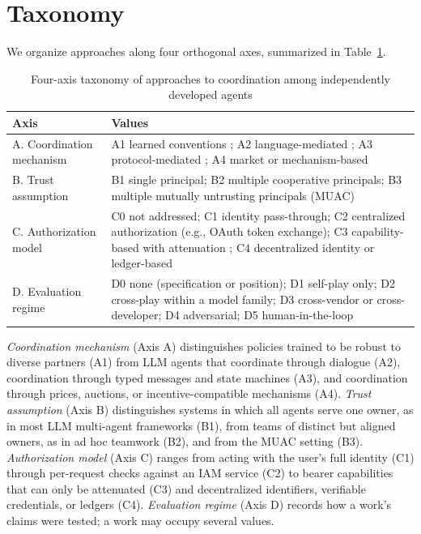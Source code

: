 \documentclass[conference]{IEEEtran}
\begin{document}
\section{Taxonomy}\label{sec-5}

We organize approaches along four orthogonal axes, summarized in Table~\ref{tab-1}.

\begin{table}[t]
\centering
\footnotesize
\setlength{\tabcolsep}{3pt}
\caption{Four-axis taxonomy of approaches to coordination among independently developed agents}
\label{tab-1}
\begin{tabularx}{\textwidth}{>{\raggedright\arraybackslash}X>{\raggedright\arraybackslash}X}
\toprule
\textbf{Axis} & \textbf{Values} \\
\midrule
A. Coordination mechanism & A1 learned conventions \cite{hu2020otherplay, strouse2021fcp, wang2024naht}; A2 language-mediated \cite{zhang2024proagent, agashe2023llmcoord}; A3 protocol-mediated \cite{smith1980contractnet, google2025a2a, qian2026mpac}; A4 market or mechanism-based \cite{bansal2025marketplace, tomasev2025virtual} \\
B. Trust assumption & B1 single principal; B2 multiple cooperative principals; B3 multiple mutually untrusting principals (MUAC) \\
C. Authorization model & C0 not addressed; C1 identity pass-through; C2 centralized authorization (e.g., OAuth token exchange); C3 capability-based with attenuation \cite{veski2026capmas}; C4 decentralized identity or ledger-based \cite{zou2025blocka2a} \\
D. Evaluation regime & D0 none (specification or position); D1 self-play only; D2 cross-play within a model family; D3 cross-vendor or cross-developer; D4 adversarial; D5 human-in-the-loop \\
\bottomrule
\end{tabularx}
\end{table}

\emph{Coordination mechanism} (Axis A) distinguishes policies trained to be robust to diverse partners (A1) from LLM agents that coordinate through dialogue (A2), coordination through typed messages and state machines (A3), and coordination through prices, auctions, or incentive-compatible mechanisms (A4). \emph{Trust assumption} (Axis B) distinguishes systems in which all agents serve one owner, as in most LLM multi-agent frameworks (B1), from teams of distinct but aligned owners, as in ad hoc teamwork (B2), and from the MUAC setting (B3). \emph{Authorization model} (Axis C) ranges from acting with the user's full identity (C1) through per-request checks against an IAM service (C2) to bearer capabilities that can only be attenuated (C3) and decentralized identifiers, verifiable credentials, or ledgers (C4). \emph{Evaluation regime} (Axis D) records how a work's claims were tested; a work may occupy several values.
\end{document}
